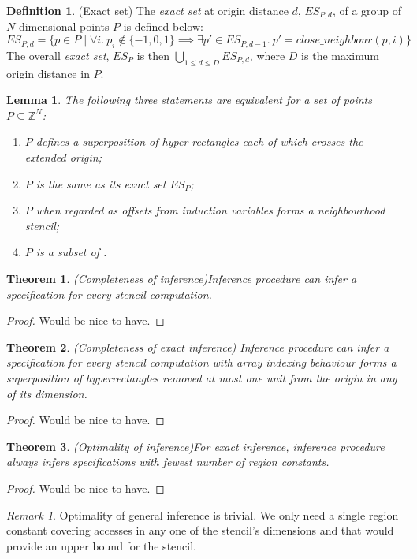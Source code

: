 \documentclass[acmlarge,review]{acmart}
\theoremstyle{definition}
\newtheorem{defn}{Definition}
\theoremstyle{plain}
\newtheorem{thm}{Theorem}
\newtheorem{lem}{Lemma}
\theoremstyle{remark}
\newtheorem{remark}{Remark}
\begin{document}
\begin{defn}{(Exact set)}
  The \emph{exact set} at origin distance $d$, $\mathit{ES}_{P,d}$, of a group
  of $N$ dimensional points $P$ is defined below:
%
  \begin{equation*}
    \mathit{ES}_{P,d} =
      \{ p \in P \mid \forall i.\
         p_i \notin \{-1,0,1\} \implies
         \exists p' \in \mathit{ES}_{P,d-1}.\ p' =
         \mathit{close\_neighbour}(p,i) \}
  \end{equation*}
%
  The overall \emph{exact set}, $\mathit{ES}_P$ is then
  $\bigcup_{1 \leq d \leq D} \mathit{ES}_{P,d}$, where $D$ is the maximum origin
  distance in $P$.
\end{defn}

\begin{lem}
  The following three statements are equivalent for a set of points $P \subseteq
  \mathbb{Z}^N$:
%
  \begin{enumerate}
    \item $P$ defines a superposition of hyper-rectangles each of which crosses
      the extended origin;
    \item $P$ is the same as its exact set $\mathit{ES}_P$;
    \item $P$ when regarded as offsets from induction variables forms a
      neighbourhood stencil;
    \item $P$ is a subset of .
  \end{enumerate}
\end{lem}

\begin{thm}{(Completeness of inference)}\label{thm:inf-completeness}
  Inference procedure can infer a specification for every stencil computation.
\end{thm}
%
\begin{proof}
  Would be nice to have.
\end{proof}

\begin{thm}{(Completeness of exact inference)}
  Inference procedure can infer a specification for every stencil computation
  with array indexing behaviour forms a superposition of hyperrectangles removed
  at most one unit from the origin in any of its dimension.
\end{thm}
%
\begin{proof}
  Would be nice to have.
\end{proof}

\begin{thm}{(Optimality of inference)}\label{thm:inf-optimality}
  For exact inference, inference procedure always infers specifications with
  fewest number of region constants.
\end{thm}
%
\begin{proof}
  Would be nice to have.
\end{proof}

\begin{remark}{}
  Optimality of general inference is trivial. We only need a single region
  constant covering accesses in any one of the stencil's dimensions and that
  would provide an upper bound for the stencil.
\end{remark}
\end{document}
